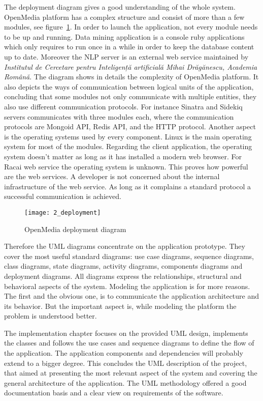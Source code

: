 The deployment diagram gives a good understanding of the whole system. OpenMedia platform has a complex structure and consist of more than a few modules, see \mbox{figure \ref{deployment}}. In order to launch the application, not every module needs to be up and running. Data mining application is a console ruby applications which only requires to run once in a while in order to keep the database content up to date. Moreover the NLP server is an external web service maintained by \emph{Institutul de Cercetare pentru Inteligență artificială Mihai Drăgănescu, Academia Română}. The diagram shows in details the complexity of OpenMedia platform. It also depicts the ways of communication between logical units of the application, concluding that some modules not only communicate with multiple entities, they also use different communication protocols. For instance Sinatra and Sidekiq servers communicates with three modules each, where the communication protocols are Mongoid API, Redis API, and the HTTP protocol. Another aspect is the operating systems used by every component. Linux is the main operating system for most of the modules. Regarding the client application, the operating system doesn't matter as long as it has installed a modern web browser. For Racai web service the operating system is unknown. This proves how powerful are the web services. A developer is not concerned about the internal infrastructure of the web service. As long as it complains a standard protocol a successful communication is achieved.

\begin{figure}[!ht]
\centering
\texttt{[image: 2\_deployment]}
\caption{OpenMedia deployment diagram}\label{deployment}
\end{figure}

Therefore the UML diagrams concentrate on the application prototype. They cover the most useful standard diagrams: use case diagrams, sequence diagrams, class diagrams, state diagrams, activity diagrams, components diagrams and deployment diagrams. All diagrams express the relationships, structural and behavioral aspects of the system. Modeling the application is for more reasons. The first and the obvious one, is to communicate the application architecture and its behavior. But the important aspect is, while modeling the platform the problem is understood better.

The implementation chapter focuses on the provided UML design, implements the classes and follows the use cases and sequence diagrams to define the flow of the application. The application components and dependencies will probably extend to a bigger degree. This concludes the UML description of the project, that aimed at presenting the most relevant aspect of the system and covering the general architecture of the application. The UML methodology offered a good documentation basis and a clear view on requirements of the software.
